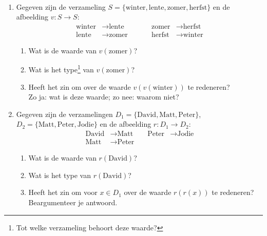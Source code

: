 \begin{exercise}\mbox{}\\
  \begin{enumerate}[label=\textbf{\alph*.}]
    \item Gegeven zijn de verzameling $S = \{ \text{winter}, \text{lente}, \text{zomer}, \text{herfst} \}$ en de afbeelding $v : S \to S$:
  \begin{equation*}
  \begin{aligned}
    \text{winter} &\longrightarrow \text{lente}\quad\quad\quad &
    \text{zomer} &\longrightarrow \text{herfst}\\
    \text{lente} &\longrightarrow \text{zomer}&
    \text{herfst} &\longrightarrow \text{winter}
  \end{aligned}
  \end{equation*}
  \begin{enumerate}[label=\textbf{\alph*.}]
      \item Wat is de waarde van $v(\text{zomer})$?
      \item Wat is het type\footnote{Tot welke verzameling behoort deze waarde?} van $v(\text{zomer})$?
      \item Heeft het zin om over de waarde $v(v(\text{winter}))$ te redeneren?\\ Zo ja: wat is deze waarde; zo nee: waarom niet?\\
  \end{enumerate}

  \item Gegeven zijn de verzamelingen $D_{1} = \{ \text{David}, \text{Matt}, \text{Peter} \}$, $D_{2} = \{ \text{Matt}, \text{Peter}, \text{Jodie} \}$ en de afbeelding $r : D_{1} \to D_{2}$:
  \begin{equation*}
  \begin{aligned}
    \text{David} &\longrightarrow \text{Matt}\quad\quad
    \text{Peter} &\longrightarrow \text{Jodie}\\
    \text{Matt} &\longrightarrow \text{Peter}
  \end{aligned}
  \end{equation*}
  \begin{enumerate}[label=\textbf{\alph*.}]
      \item Wat is de waarde van $r(\text{David})$?
      \item Wat is het type van $r(\text{David})$?
      \item Heeft het zin om voor $x \in D_{1}$ over de waarde $r(r(x))$ te redeneren?\\ Beargumenteer je antwoord.
  \end{enumerate}
  \end{enumerate}
\end{exercise}

